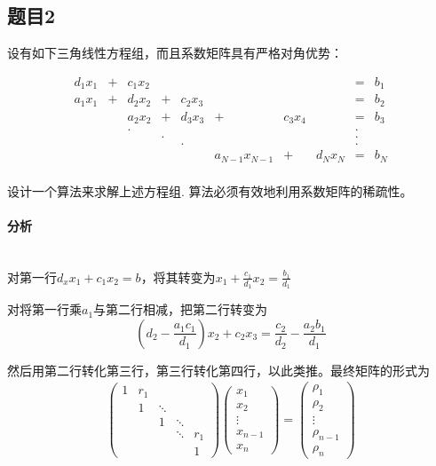 \subsection{题目2}

设有如下三角线性方程组，而且系数矩阵具有严格对角优势：

$$
\begin{matrix}
d_1x_1 &+&c_1x_2 &  & & & & &=&b_1\\
a_1x_1 &+& d_2x_2&+& c_2x_3 & & & &=&b_2\\
& & a_2x_2 &+& d_3x_3 &+& c_3x_4 & &=&b_3\\
& & . & & & &&&.\\
& &  &. & & &&&.\\
& & & &. & &&&.\\
& & & &  & a_{N-1}x_{N-1}&+&d_Nx_N&=&b_N\\
\end{matrix}
$$

设计一个算法来求解上述方程组. 算法必须有效地利用系数矩阵的稀疏性。

\paragraph{分析}
~\\
对第一行$d_xx_1 +c_1x_2 = b$，将其转变为$x_1 + \frac{c_1}{d_1}x_2 = \frac{b_1}{d_1}$

对将第一行乘$a_1$与第二行相减，把第二行转变为\[(d_2 - \frac{a_1c_1}{d_1})x_2 + c_2x_3 = \frac{c_2}{d_2} - \frac{a_2b_1}{d_1}\]

然后用第二行转化第三行，第三行转化第四行，以此类推。最终矩阵的形式为
\begin{align*}
\begin{pmatrix}
1 & r_1 & &  & \\ 
& 1 & \ddots & & \\ 
&  & 1 & \ddots & \\ 
&  &  & \ddots & r_1\\ 
&  &  &  & 1
\end{pmatrix}
\begin{pmatrix}
x_1\\ 
x_2\\ 
\vdots\\ 
x_{n-1}\\
x_n
\end{pmatrix}
=
\begin{pmatrix}
\rho_1\\ 
\rho_2\\ 
\vdots\\ 
\rho_{n-1}\\
\rho_n
\end{pmatrix}
\end{align*}

